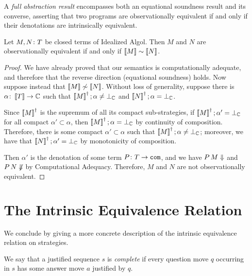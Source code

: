 \documentclass[11pt]{report}
\begin{document}
\begin{definition}
  A \emph{full abstraction result} encompasses both an equational soundness result and its converse, asserting that two programs are observationally equivalent if and only if their denotations are intrinsically equivalent.
\end{definition}

\begin{theorem}
  Let $M,N\colon T$ be closed terms of Idealized Algol.  
  Then $M$ and $N$ are observationally equivalent if and only if $\left\llbracket M\right\rrbracket\sim\left\llbracket N\right\rrbracket$.
\end{theorem}
\begin{proof}
  We have already proved that our semantics is computationally adequate, and therefore that the reverse direction (equational soundness) holds.  
  Now suppose instead that $\left\llbracket M\right\rrbracket\not\sim\left\llbracket N\right\rrbracket$.
  Without loss of generality, suppose there is $\alpha\colon \left\llbracket T\right\rrbracket\to \mathbb{C}$ such that $\left\llbracket M\right\rrbracket^\dag;\alpha\ne\bot_{\mathbb{C}}$ and $\left\llbracket N\right\rrbracket^\dag;\alpha=\bot_{\mathbb{C}}$.

  Since $\left\llbracket M\right\rrbracket^\dag$ is the supremum of all its compact sub-strategies, if $\left\llbracket M\right\rrbracket^\dag;\alpha'=\bot_{\mathbb{C}}$ for all compact $\alpha'\subset \alpha$, then $\left\llbracket M\right\rrbracket^\dag;\alpha=\bot_{\mathbb{C}}$ by continuity of composition.  
  Therefore, there is some compact $\alpha'\subset\alpha$ such that $\left\llbracket M\right\rrbracket^\dag;\alpha\ne\bot_{\mathbb{C}}$; moreover, we have that $\left\llbracket N\right\rrbracket^\dag;\alpha'=\bot_{\mathbb{C}}$ by monotonicity of composition.  

  Then $\alpha'$ is the denotation of some term $P\colon T \to {\mathtt{com}}$, and we have $P\,M\Downarrow$ and $P\,N\not\Downarrow$ by Computational Adequacy.  
  Therefore, $M$ and $N$ are not observationally equivalent.
\end{proof}

\section{The Intrinsic Equivalence Relation}

We conclude by giving a more concrete description of the intrinsic equivalence relation on strategies.

\begin{definition}
  We say that a justified sequence $s$ is \emph{complete} if every question move $q$ occurring in $s$ has some answer move $a$ justified by $q$.
\end{definition}
\end{document}
